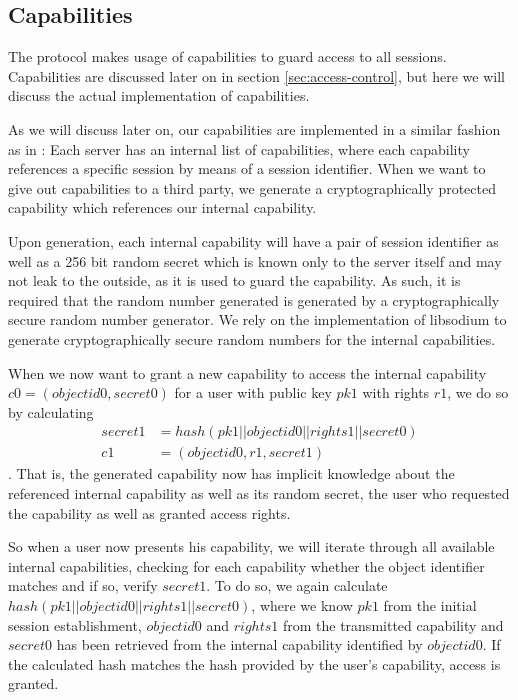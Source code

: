 \subsection{Capabilities}
\label{sec:capabilities}

The protocol makes usage of capabilities to guard access to all sessions.
Capabilities are discussed later on in section \ref{sec:access-control}, but here we will discuss the actual implementation of capabilities.

As we will discuss later on, our capabilities are implemented in a similar fashion as in \cite{gong1989secure}:
Each server has an internal list of capabilities, where each capability references a specific session by means of a session identifier.
When we want to give out capabilities to a third party, we generate a cryptographically protected capability which references our internal capability.

Upon generation, each internal capability will have a pair of session identifier as well as a 256 bit random secret which is known only to the server itself and may not leak to the outside, as it is used to guard the capability.
As such, it is required that the random number generated is generated by a cryptographically secure random number generator.
We rely on the implementation of libsodium to generate cryptographically secure random numbers for the internal capabilities.

When we now want to grant a new capability to access the internal capability $c0 = (objectid0, secret0)$ for a user with public key $pk1$ with rights $r1$, we do so by calculating
\begin{align*}
    secret1 &= hash(pk1 || objectid0 || rights1 || secret0) \\
    c1 &= (objectid0, r1, secret1)
\end{align*}.
That is, the generated capability now has implicit knowledge about the referenced internal capability as well as its random secret, the user who requested the capability as well as granted access rights.

So when a user now presents his capability, we will iterate through all available internal capabilities, checking for each capability whether the object identifier matches and if so, verify $secret1$.
To do so, we again calculate $hash(pk1 || objectid0 || rights1 || secret0)$, where we know $pk1$ from the initial session establishment, $objectid0$ and $rights1$ from the transmitted capability and $secret0$ has been retrieved from the internal capability identified by $objectid0$.
If the calculated hash matches the hash provided by the user's capability, access is granted.

